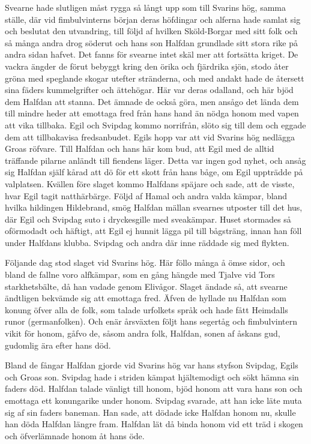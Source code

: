 Svearne hade slutligen måst rygga så långt upp som till Svarins hög,
samma ställe, där vid fimbulvinterns början deras höfdingar och alferna
hade samlat sig och beslutat den utvandring, till följd af hvilken
Sköld-Borgar med sitt folk och så många andra drog söderut och hans son
Halfdan grundlade sitt stora rike på andra sidan hafvet. Det fanns för
svearne intet skäl mer att fortsätta kriget. De vackra ängder de förut
bebyggt kring den örika och fjärdrika sjön, stodo åter gröna med
speglande skogar utefter stränderna, och med andakt hade de återsett
sina fäders kummelgrifter och ättehögar. Här var deras odalland, och här
bjöd dem Halfdan att stanna. Det ämnade de också göra, men ansågo det
lända dem till mindre heder att emottaga fred från hans hand än nödga
honom med vapen att vika tillbaka. Egil och Svipdag kommo norrifrån,
slöto sig till dem och eggade dem att tillbakavisa fredsanbudet. Egils
hopp var att vid Svarins hög nedlägga Groas röfvare. Till Halfdan och
hans här kom bud, att Egil med de alltid träffande pilarne anländt till
fiendens läger. Detta var ingen god nyhet, och ansåg sig Halfdan själf
kårad att dö för ett skott från hans båge, om Egil uppträdde på
valplatsen. Kvällen före slaget kommo Halfdans späjare och sade, att de
visste, hvar Egil tagit natthärbärge. Följd af Hamal och andra valda
kämpar, bland hvilka hildingen Hildebrand, smög Halfdan mällan svearnes
utposter till det hus, där Egil och Svipdag suto i dryckesgille med
sveakämpar. Huset stormades så oförmodadt och häftigt, att Egil ej
hunnit lägga pil till bågsträng, innan han föll under Halfdans klubba.
Svipdag och andra där inne räddade sig med flykten.

Följande dag stod slaget vid Svarins hög. Här föllo
\protect\hypertarget{lb1625905.xhtmlux5cux23start117}{}{}\protect\hypertarget{lb1625905.xhtmlux5cux23start117-a}{}{}\protect\hypertarget{lb1625905.xhtmlux5cux23start117-b}{}{}\protect\hypertarget{lb1625905.xhtmlux5cux23start117-c}{}{}\protect\hypertarget{lb1625905.xhtmlux5cux23start117-d}{}{}
många å ömse sidor, och bland de fallne voro alfkämpar, som en gång
hängde med Tjalve vid Tors starkhetsbälte, då han vadade genom Elivågor.
Slaget ändade så, att svearne ändtligen bekvämde sig att emottaga fred.
Äfven de hyllade nu Halfdan som konung öfver alla de folk, som talade
urfolkets språk och hade fått Heimdalls runor (germanfolken). Och enär
årsväxten följt hans segertåg och fimbulvintern vikit för honom, gåfvo
de, såsom andra folk, Halfdan, sonen af åskans gud, gudomlig ära efter
hans död.

Bland de fångar Halfdan gjorde vid Svarins hög var hans styfson Svipdag,
Egils och Groas son. Svipdag hade i striden kämpat hjältemodigt och sökt
hämna sin faders död. Halfdan talade vänligt till honom, bjöd honom att
vara hans son och emottaga ett konungarike under honom. Svipdag svarade,
att han icke läte muta sig af sin faders baneman. Han sade, att dödade
icke Halfdan honom nu, skulle han döda Halfdan längre fram. Halfdan lät
då binda honom vid ett träd i skogen och öfverlämnade honom åt hans öde.

